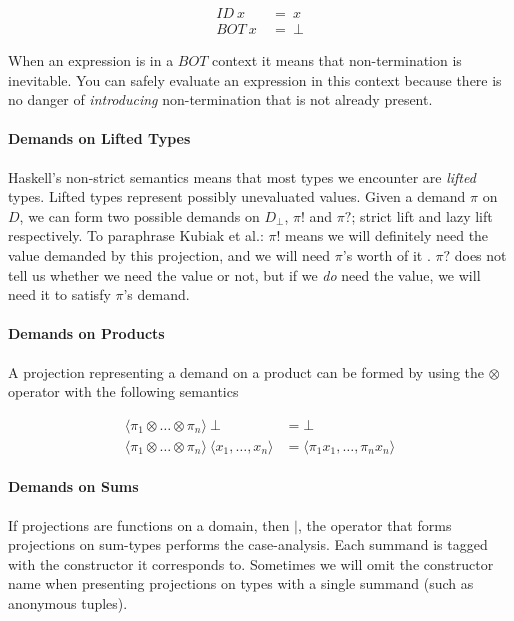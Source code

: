 \begin{align}
ID \ x \ &= \ x \\
BOT \ x \ &= \ \bot
\end{align}


When an expression is in a $BOT$ context it means that non-termination is
inevitable. You can safely evaluate an expression in this context because there
is no danger of \emph{introducing} non-termination that is not already present.

\paragraph{Demands on Lifted Types} Haskell's non-strict semantics means that
most types we encounter are \emph{lifted} types.  Lifted types represent
possibly unevaluated values. Given a demand $\pi$ on $D$, we can form two
possible demands on $D_{\bot}$, $\pi!$ and $\pi?$; strict lift and lazy lift
respectively. To paraphrase Kubiak et al.: $\pi!$ means we will definitely need
the value demanded by this projection, and we will need $\pi$'s worth of it
\citep{kubiak}. $\pi?$ does not tell us whether we need the value or not, but if
we \emph{do} need the value, we will need it to satisfy $\pi$'s demand.

\paragraph{Demands on Products} A projection representing a demand on a product
can be formed by using the $\otimes$ operator with the following semantics

\begin{align*}
\langle \pi_{1} \otimes \dots \otimes \pi_{n} \rangle \ \bot &= \bot \\
\langle \pi_{1} \otimes \dots \otimes \pi_{n} \rangle \ 
\langle x_{1}, \dots, x_{n} \rangle &= \langle \pi_{1} x_{1}, \dots, \pi_{n} x_{n} \rangle
\end{align*}

\paragraph{Demands on Sums} If projections are functions on a domain, then
\nolinebreak $|$, the operator that forms projections on sum-types performs the
case-analysis. Each summand is tagged with the constructor it corresponds to.
Sometimes we will omit the constructor name when presenting projections on
types with a single summand (such as anonymous tuples).

